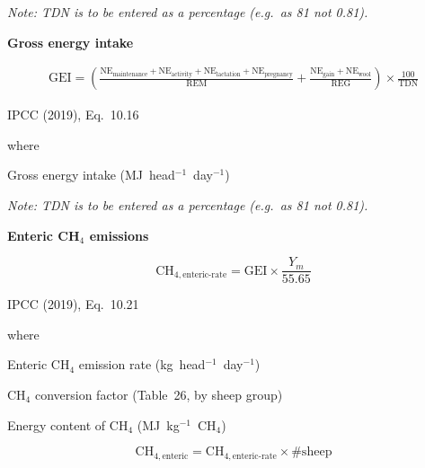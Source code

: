 \noindent\textit{Note: TDN is to be entered as a percentage (e.g.\ as 81 not 0.81).}

\bigskip
\noindent\textbf{Gross energy intake}

\begin{multline}
    \mathrm{GEI} =
        \left(\frac{\mathrm{NE}_{\mathrm{maintenance}} + \mathrm{NE}_{\mathrm{activity}}
            + \mathrm{NE}_{\mathrm{lactation}} + \mathrm{NE}_{\mathrm{pregnancy}}}
            {\mathrm{REM}}
        + \frac{\mathrm{NE}_{\mathrm{gain}} + \mathrm{NE}_{\mathrm{wool}}}
               {\mathrm{REG}}\right)
        \times \frac{100}{\mathrm{TDN}}
    \tag{Eq.\ 3.3.1.13}
\end{multline}

\noindent IPCC (2019), Eq.~10.16

\noindent where
\begin{description}[font=\normalfont, leftmargin=6em, style=sameline, nosep]
    \item[$\mathrm{GEI}$] Gross energy intake (MJ~head$^{-1}$~day$^{-1}$)
\end{description}

\noindent\textit{Note: TDN is to be entered as a percentage (e.g.\ as 81 not 0.81).}

\bigskip
\noindent\textbf{Enteric CH$_4$ emissions}

\begin{equation}
    \mathrm{CH}_{4,\mathrm{enteric\text{-}rate}} =
        \mathrm{GEI} \times \frac{Y_m}{55.65}
    \tag{Eq.\ 3.3.1.14}
\end{equation}

\noindent IPCC (2019), Eq.~10.21

\noindent where
\begin{description}[font=\normalfont, leftmargin=9em, style=sameline, nosep]
    \item[$\mathrm{CH}_{4,\mathrm{enteric\text{-}rate}}$] Enteric CH$_4$ emission
          rate (kg~head$^{-1}$~day$^{-1}$)
    \item[$Y_m$] CH$_4$ conversion factor (Table~26, by sheep group)
    \item[$55.65$] Energy content of CH$_4$ (MJ~kg$^{-1}$~CH$_4$)
\end{description}

\begin{equation}
    \mathrm{CH}_{4,\mathrm{enteric}} =
        \mathrm{CH}_{4,\mathrm{enteric\text{-}rate}} \times \#\mathrm{sheep}
    \tag{Eq.\ 3.3.1.15}
\end{equation}

